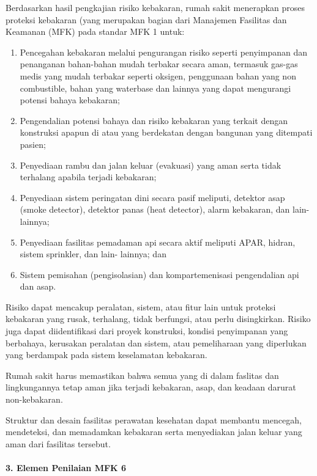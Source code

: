 \documentclass[
]{book}
\providecommand{\tightlist}{%
  \setlength{\itemsep}{0pt}\setlength{\parskip}{0pt}}
\begin{document}
Berdasarkan hasil pengkajian risiko kebakaran, rumah sakit menerapkan proses proteksi kebakaran (yang merupakan bagian dari Manajemen Fasilitas dan Keamanan (MFK) pada standar MFK 1 untuk:

\begin{enumerate}
\def\labelenumi{\alph{enumi}.}
\tightlist
\item
  Pencegahan kebakaran melalui pengurangan risiko seperti penyimpanan dan penanganan bahan-bahan mudah terbakar secara aman, termasuk gas-gas medis yang mudah terbakar seperti oksigen, penggunaan bahan yang non combustible, bahan yang waterbase dan lainnya yang dapat mengurangi potensi bahaya kebakaran;
\item
  Pengendalian potensi bahaya dan risiko kebakaran yang terkait dengan konstruksi apapun di atau yang berdekatan dengan bangunan yang ditempati pasien;
\item
  Penyediaan rambu dan jalan keluar (evakuasi) yang aman serta tidak terhalang apabila terjadi kebakaran;
\item
  Penyediaan sistem peringatan dini secara pasif meliputi, detektor asap (smoke detector), detektor panas (heat detector), alarm kebakaran, dan lain- lainnya;
\item
  Penyediaan fasilitas pemadaman api secara aktif meliputi APAR, hidran, sistem sprinkler, dan lain- lainnya; dan
\item
  Sistem pemisahan (pengisolasian) dan kompartemenisasi pengendalian api dan asap.
\end{enumerate}

Risiko dapat mencakup peralatan, sistem, atau fitur lain untuk proteksi kebakaran yang rusak, terhalang, tidak berfungsi, atau perlu disingkirkan. Risiko juga dapat diidentifikasi dari proyek konstruksi, kondisi penyimpanan yang berbahaya, kerusakan peralatan dan sistem, atau pemeliharaan yang diperlukan yang berdampak pada sistem keselamatan kebakaran.

Rumah sakit harus memastikan bahwa semua yang di dalam faslitas dan lingkungannya tetap aman jika terjadi kebakaran, asap, dan keadaan darurat non-kebakaran.

Struktur dan desain fasilitas perawatan kesehatan dapat membantu mencegah, mendeteksi, dan memadamkan kebakaran serta menyediakan jalan keluar yang aman dari fasilitas tersebut.

\hypertarget{elemen-penilaian-mfk-6}{%
\paragraph*{3. Elemen Penilaian MFK 6}\label{elemen-penilaian-mfk-6}}
\end{document}
